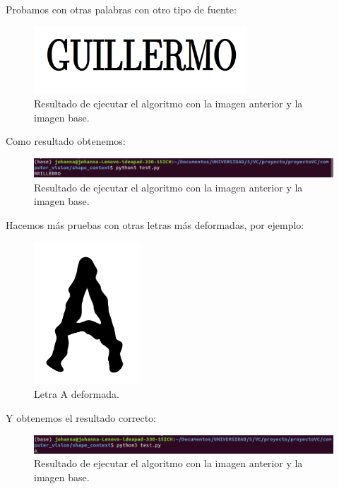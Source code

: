 \documentclass[size=a4, parskip=half, titlepage=false, toc=flat, toc=bib, 12pt]{scrartcl}
\begin{document}
Probamos con otras palabras con otro tipo de fuente:
\begin{figure}[H]
\centering
\includegraphics[width=8cm]{./img/GUILLERMO}
\caption{Resultado de ejecutar el algoritmo con la imagen anterior y la imagen base.}
\end{figure}

Como resultado obtenemos:

\begin{figure}[H]
\centering
\includegraphics[width=15cm]{./img/resguillermo}
\caption{Resultado de ejecutar el algoritmo con la imagen anterior y la imagen base.}
\end{figure}

Hacemos más pruebas con otras letras más deformadas, por ejemplo:

\begin{figure}[H]
\centering
\includegraphics[width=4cm]{./img/AM}
\caption{Letra A deformada.}
\end{figure}

Y obtenemos el resultado correcto:
\begin{figure}[H]
\centering
\includegraphics[width=15cm]{./img/resa}
\caption{Resultado de ejecutar el algoritmo con la imagen anterior y la imagen base.}
\end{figure}

\end{document}
